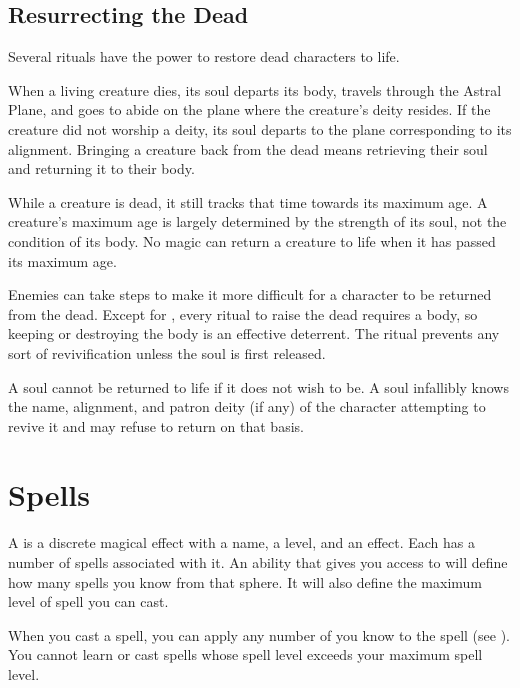     \subsection{Resurrecting the Dead}\label{Resurrecting the Dead}
        Several rituals have the power to restore dead characters to life.

        When a living creature dies, its soul departs its body, travels through the Astral Plane, and goes to abide on the plane where the creature's deity resides.
        If the creature did not worship a deity, its soul departs to the plane corresponding to its alignment.
        Bringing a creature back from the dead means retrieving their soul and returning it to their body.

         While a creature is dead, it still tracks that time towards its maximum age.
        A creature's maximum age is largely determined by the strength of its soul, not the condition of its body.
        No magic can return a creature to life when it has passed its maximum age.

         Enemies can take steps to make it more difficult for a character to be returned from the dead.
        Except for , every ritual to raise the dead requires a body, so keeping or destroying the body is an effective deterrent.
        The  ritual prevents any sort of revivification unless the soul is first released.

         A soul cannot be returned to life if it does not wish to be.
        A soul infallibly knows the name, alignment, and patron deity (if any) of the character attempting to revive it and may refuse to return on that basis.

\section{Spells}\label{Spells}
    A  is a discrete magical effect with a name, a level, and an effect.
    Each  has a number of spells associated with it.
    An ability that gives you access to  will define how many spells you know from that sphere.
    It will also define the maximum level of spell you can cast.

    When you cast a spell, you can apply any number of  you know to the spell (see ).
    You cannot learn or cast spells whose spell level exceeds your maximum spell level.

